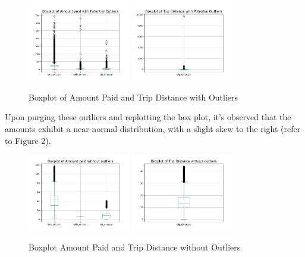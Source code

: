 \documentclass[11pt]{article}
\begin{document}
\begin{figure}[H]
    \centering 
     \includegraphics[width=0.4\textwidth]{plots/boxplot of amount paid.png}
     \includegraphics[width=0.4\textwidth]{plots/boxplot of trip distance.png}
     \caption{Boxplot of Amount Paid and Trip Distance with Outliers}
\end{figure}

Upon purging these outliers and replotting the box plot, it's observed that the amounts exhibit a near-normal distribution, with a slight skew to the right (refer to Figure 2).

\begin{figure}[H]
    \centering 
     \includegraphics[width=0.4\textwidth]{plots/boxplot of amount paid without outliers.png}
     \includegraphics[width=0.4\textwidth]{plots/boxplot of trip distance without outliers.png}
     \caption{Boxplot Amount Paid and Trip Distance without Outliers}
\end{figure}
\end{document}
